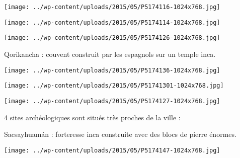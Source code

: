  

\begin{center} \texttt{[image: ../wp-content/uploads/2015/05/P5174116-1024x768.jpg]} \end{center}

 

 

\begin{center} \texttt{[image: ../wp-content/uploads/2015/05/P5174114-1024x768.jpg]} \end{center}

 

 

\begin{center} \texttt{[image: ../wp-content/uploads/2015/05/P5174126-1024x768.jpg]} \end{center}

 

 Qorikancha : couvent construit par les espagnols sur un temple inca. 

 

\begin{center} \texttt{[image: ../wp-content/uploads/2015/05/P5174136-1024x768.jpg]} \end{center}

 

 

\begin{center} \texttt{[image: ../wp-content/uploads/2015/05/P51741301-1024x768.jpg]} \end{center}

 

 

\begin{center} \texttt{[image: ../wp-content/uploads/2015/05/P5174127-1024x768.jpg]} \end{center}

 

 4 sites archéologiques sont situés très proches de la ville : 

 Sacsayhuamán : forteresse inca construite avec des blocs de pierre énormes. 

 

\begin{center} \texttt{[image: ../wp-content/uploads/2015/05/P5174147-1024x768.jpg]} \end{center}

 

 

